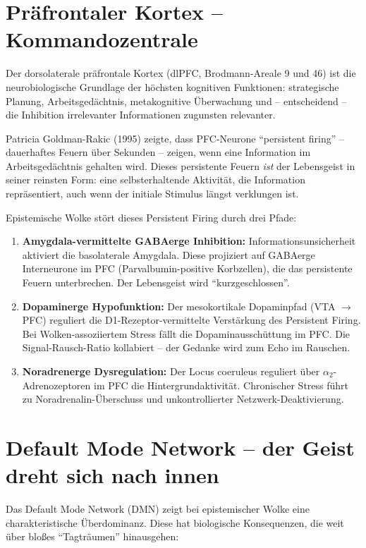 ﻿\documentclass[12pt,a4paper]{report}
\theoremstyle{plain}
\theoremstyle{definition}
\theoremstyle{remark}
\begin{document}
	\section{Präfrontaler Kortex -- Kommandozentrale}
	
	Der dorsolaterale präfrontale Kortex (dlPFC, Brodmann-Areale 9 und 46)
	ist die neurobiologische Grundlage der höchsten kognitiven Funktionen:
	strategische Planung, Arbeitsgedächtnis, metakognitive Überwachung
	und -- entscheidend -- die Inhibition irrelevanter Informationen
	zugunsten relevanter.
	
	Patricia Goldman-Rakic (1995) zeigte, dass PFC-Neurone ``persistent
	firing'' -- dauerhaftes Feuern über Sekunden -- zeigen, wenn
	eine Information im Arbeitsgedächtnis gehalten wird.
	Dieses persistente Feuern \emph{ist} der Lebensgeist in seiner
	reinsten Form: eine selbsterhaltende Aktivität, die Information
	repräsentiert, auch wenn der initiale Stimulus längst verklungen ist.
	
	Epistemische Wolke stört dieses Persistent Firing durch drei Pfade:
	\begin{enumerate}[label=(\roman*), leftmargin=1.6cm]
		\item \textbf{Amygdala-vermittelte GABAerge Inhibition:}
		Informationsunsicherheit aktiviert die basolaterale Amygdala.
		Diese projiziert auf GABAerge Interneurone im PFC (Parvalbumin-positive
		Korbzellen), die das persistente Feuern unterbrechen.
		Der Lebensgeist wird ``kurzgeschlossen''.
		\item \textbf{Dopaminerge Hypofunktion:}
		Der mesokortikale Dopaminpfad (VTA $\to$ PFC) reguliert die
		D1-Rezeptor-vermittelte Verstärkung des Persistent Firing.
		Bei Wol\-ken-assoziiertem Stress fällt die Dopaminausschüttung
		im PFC. Die Signal-Rausch-Ratio kollabiert -- der Gedanke wird
		zum Echo im Rauschen.
		\item \textbf{Noradrenerge Dysregulation:}
		Der Locus coeruleus reguliert über $\alpha_2$-Adreno\-zeptoren im PFC
		die Hintergrundaktivität. Chronischer Stress führt zu
		Nora\-drena\-lin-Überschuss und unkontrollierter Netzwerk-Deaktivierung.
	\end{enumerate}
	
	\section{Default Mode Network -- der Geist dreht sich nach innen}
	
	Das Default Mode Network (DMN) zeigt bei epistemischer Wolke eine charakteristische
	Überdominanz. Diese hat biologische Konsequenzen, die weit über blo\ss{}es
	``Tagträumen'' hinausgehen:
	
\end{document}
